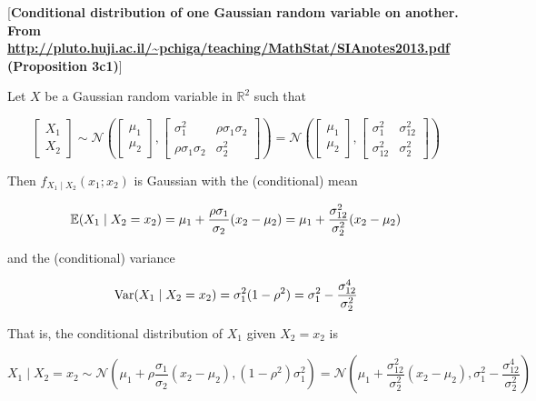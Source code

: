 \begin{proposition}\label{prob.cond.bivar.norm.dist}[\textbf{Conditional distribution of one Gaussian random variable on another. From \url{http://pluto.huji.ac.il/~pchiga/teaching/MathStat/SIAnotes2013.pdf} (Proposition 3c1)}]

Let \(X\) be a Gaussian random variable in \(\mathbb{R}^2\) such that

\[
\begin{bmatrix} X_1 \\ X_2 \end{bmatrix}  \sim \mathcal{N}\left(\begin{bmatrix} \mu_1 \\ \mu_2 \end{bmatrix}, \begin{bmatrix} \sigma_1^2 & \rho \sigma_1 \sigma_2 \\  \rho \sigma_1 \sigma_2 & \sigma_2^2 \end{bmatrix}  \right) =  \mathcal{N}\left(\begin{bmatrix} \mu_1 \\ \mu_2 \end{bmatrix}, \begin{bmatrix} \sigma_1^2 &\sigma_{12}^2 \\  \sigma_{12}^2 & \sigma_2^2 \end{bmatrix}  \right)
\]

Then \(f_{X_1 \mid X_2}(x_1; x_2)\) is Gaussian with the (conditional) mean

\[
\mathbb{E}(X_1 \mid X_2 = x_2) = \mu_1 + \frac{\rho \sigma_1}{\sigma_2} (x_2 - \mu_2) = \mu_1 + \frac{\sigma_{12}^2}{ \sigma_2^2} (x_2 - \mu_2)
\]

and the (conditional) variance

\[
\mathrm{Var}(X_1 \mid X_2 = x_2) = \sigma_1^2 (1 - \rho^2) =  \sigma_1^2 - \frac{\sigma_{12}^4}{ \sigma_2^2}
\]

That is, the conditional distribution of \(X_1\) given \(X_2 = x_2\) is

\[
X_1 \mid X_2 = x_2 \sim \mathcal{N} \left( \mu_1 + \rho \frac{\sigma_1}{\sigma_2}(x_2 - \mu_2), (1 - \rho^2)\sigma_1^2 \right) = \mathcal{N} \left( \mu_1 + \frac{\sigma_{12}^2}{ \sigma_2^2} (x_2 - \mu_2), \sigma_1^2 - \frac{\sigma_{12}^4}{ \sigma_2^2} \right)
\]
\end{proposition} 

